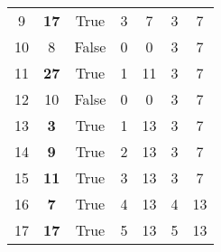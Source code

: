 \begin{inlinetable}
\begin{tabular}{S[table-format=2.0] S[table-format=2.0] c S[table-format=2.0]
    S[table-format=2.0] S[table-format=2.0] S[table-format=2.0]}
    9          & \bfseries 17 & True     & 3           & 7           & 3              & 7              \\
    10         & 8            & False    & 0           & 0           & 3              & 7              \\
    11         & \bfseries 27 & True     & 1           & 11          & 3              & 7              \\
    12         & 10           & False    & 0           & 0           & 3              & 7              \\
    13         & \bfseries 3  & True     & 1           & 13          & 3              & 7              \\
    14         & \bfseries 9  & True     & 2           & 13          & 3              & 7              \\
    15         & \bfseries 11 & True     & 3           & 13          & 3              & 7              \\
    16         & \bfseries 7  & True     & 4           & 13          & 4              & 13             \\
    17         & \bfseries 17 & True     & 5           & 13          & 5              & 13             \\
    \bottomrule
  \end{tabular}
\end{inlinetable}
